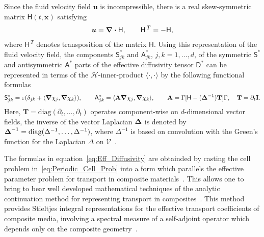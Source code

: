 \documentclass[leqno,onefignum,onetabnum]{siamltex1213}
\newcommand{\Tb}{\mathbf{T}}
\newcommand{\Ab}{\mathbf{A}}
\newcommand{\bI}{\mathbf{I}}
\newcommand{\Vc}{\mathcal{V}}
\newcommand{\Hc}{\mathcal{H}}
\newcommand{\Dm}{\mathsf{D}}
\newcommand{\Hm}{\mathsf{H}}
\newcommand{\Sm}{\mathsf{S}}
\newcommand{\Am}{\mathsf{A}}
\newcommand\bDelta{\mbox{\boldmath${\Delta}$}}
\newcommand\bnabla{\mbox{\boldmath${\nabla}$}}
\providecommand\bcdot{\boldsymbol{\cdot}}
\newcommand{\vecx}{\boldsymbol{x}}
\newcommand{\vecu}{\boldsymbol{u}}
\begin{document}
Since the fluid velocity field $\vecu$ is incompressible, there is a
real skew-symmetric matrix $\Hm(t,\vecx)$
satisfying~\cite{Avellaneda:PRL-753,Avellaneda:CMP-339}   
% 
\begin{align}\label{eq:u_DH}
 \vecu =\bnabla \bcdot\Hm, \qquad   \Hm^{\,T}=-\Hm,
\end{align}
% 
where $\Hm^{\,T}$ denotes transposition of the matrix $\Hm$. Using
this representation of the fluid velocity field, the components
$\Sm^*_{jk}$ and $\Am^*_{jk}$, $j,k=1,\ldots,d$, of the symmetric $\Sm^*$
and antisymmetric $\Am^*$ parts of the effective diffusivity tensor
$\Dm^*$ can be represented in terms of the $\Hc$-inner-product
$\langle\cdot,\cdot\rangle$ by the following functional
formulas~\cite{Avellaneda:PRL-753,Avellaneda:CMP-339}   
%
\begin{align}\label{eq:Eff_Diffusivity}
 \Sm^*_{jk}=\varepsilon(\delta_{jk}+\langle\bnabla \chi_j,\bnabla \chi_k\rangle), \qquad
 \Am^*_{jk}=\langle\Ab\bnabla \chi_j,\bnabla \chi_k\rangle, \qquad
 \Ab=\Gamma[\Hm-(\bDelta^{-1})\Tb]\Gamma, \quad \Tb=\partial_t\bI.
\end{align}
%
Here, $\Tb=\text{diag}(\partial_t,\ldots,\partial_t)$ operates component-wise on
$d$-dimensional vector fields, the inverse of the vector Laplacian
$\bDelta$ is denoted by $\bDelta^{-1}=\text{diag}(\Delta^{-1},\ldots,\Delta^{-1})$,
where $\Delta^{-1}$ is based on convolution with the
Green's function for the Laplacian $\Delta$ on
$\Vc$~\cite{Stakgold:BVP:2000}.  





The formulas in equation~\eqref{eq:Eff_Diffusivity} are obtainded by
casting the cell problem in~\eqref{eq:Periodic_Cell_Prob} into a form
which parallels the effective parameter problem for transport in
composite materials~\cite{Avellaneda:PRL-753,Avellaneda:CMP-339}. This
allows one to bring to bear well developed mathematical techniques of
the analytic continuation method for representing transport in
composites~\cite{Golden:CMP-473,MILTON:2002:TC}. This method provides
Stieltjes integral representations for the effective transport
coefficients of composite media, involving a spectral measure of a
self-adjoint operator which depends only on the composite
geometry~\cite{Golden:CMP-473,Murphy:JMP:063506,MILTON:2002:TC}.
\end{document}
